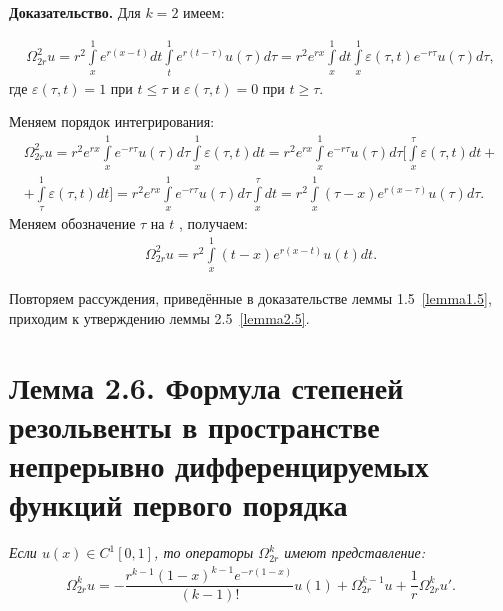 \textbf{Доказательство.} Для $ k = 2 $ имеем:

\begin{equation}
\begin{array}{c}
\nonumber

\Omega_{2r}^2u = r^2\int\limits_x^1 e^{r(x-t)}dt\int\limits_t^1 e^{r(t-\tau)}u(\tau)d\tau = r^2e^{rx} \int\limits_x^1 dt \int\limits_x^1 \varepsilon (\tau ,t)e^{-r\tau}u(\tau)d\tau ,

\end{array}
\end{equation}
где $ \varepsilon (\tau ,t) = 1 $ при $ t \leq \tau $ и $ \varepsilon (\tau ,t) = 0 $ при $ t \geq \tau $.

Меняем порядок интегрирования:
\begin{equation}
\begin{array}{c}
\nonumber

\Omega_{2r}^2u = r^2e^{rx} \int\limits_x^1 e^{-r\tau}u(\tau)d\tau \int\limits_x^1 \varepsilon (\tau ,t) dt = r^2e^{rx} \int\limits_x^1 e^{-r\tau}u(\tau)d\tau \biggl[ \int\limits_x^{\tau} \varepsilon (\tau ,t)dt + \\ + \int\limits_{\tau}^1 \varepsilon (\tau ,t)dt \biggr] = r^2e^{rx} \int\limits_x^1 e^{-r\tau}u(\tau)d\tau \int\limits_x^{\tau}dt = r^2 \int\limits_x^1(\tau - x)e^{r(x-\tau)}u(\tau)d\tau .

\end{array}
\end{equation}
Меняем обозначение $ \tau $ на $ t $ , получаем:
\begin{equation}
\begin{array}{c}
\nonumber

\Omega_{2r}^2u = r^2\int\limits_x^1 (t-x)e^{r(x-t)}u(t)dt.

\end{array}
\end{equation}

Повторяем рассуждения, приведённые в доказательстве леммы 1.5~\eqref{lemma1.5}, приходим к утверждению леммы 2.5~\eqref{lemma2.5}.

\section{Лемма 2.6. Формула степеней резольвенты в пространстве непрерывно дифференцируемых функций первого порядка}
\label{lemma2.6}
\textit{Если $ u(x) \in C^1[0,1] $, то операторы $ \Omega_{2r}^k $ имеют представление:}
\begin{equation}
\begin{array}{c}

\Omega_{2r}^ku = -\dfrac{r^{k-1}(1-x)^{k-1}e^{-r(1-x)}}{(k-1)!}u(1) + \Omega_{2r}^{k-1}u + \dfrac{1}{r}\Omega_{2r}^ku'.

\end{array}
\end{equation}

